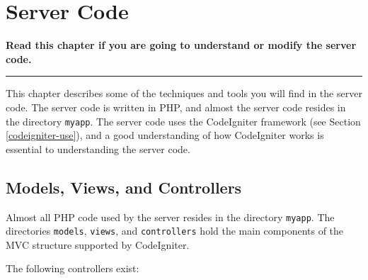 \documentclass[11pt,oneside,a4paper]{memoir}
\begin{document}
\chapter{Server Code}\label{server-code}

\textbf{Read this chapter if you are going to understand or modify the server code.}
\plainbreak{3}

This chapter describes some of the techniques and tools you will find in the server code. The server
code is written in PHP, and almost the server code resides in the directory \texttt{myapp}. The
server code uses the CodeIgniter framework (see Section \ref{codeigniter-use}), and a good
understanding of how CodeIgniter works is essential to understanding the server code.

\section{Models, Views, and Controllers}

Almost all PHP code used by the server resides in the directory \texttt{myapp}. The directories
\texttt{models}, \texttt{views}, and \texttt{controllers} hold the main components of the MVC
structure supported by CodeIgniter.

The following controllers exist:
\end{document}
